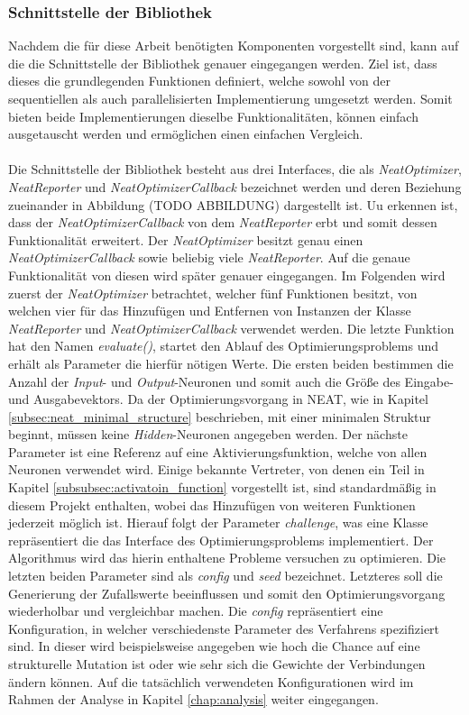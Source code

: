\subsubsection{Schnittstelle der Bibliothek}
Nachdem die für diese Arbeit benötigten Komponenten vorgestellt sind, kann auf die die Schnittstelle der Bibliothek genauer eingegangen werden. Ziel ist, dass dieses die grundlegenden Funktionen definiert, welche sowohl von der sequentiellen als auch parallelisierten Implementierung umgesetzt werden. Somit bieten beide Implementierungen dieselbe Funktionalitäten, können einfach ausgetauscht werden und ermöglichen einen einfachen Vergleich. 
\\\\
Die Schnittstelle der Bibliothek besteht aus drei Interfaces, die als \emph{NeatOptimizer}, \emph{NeatReporter} und \emph{NeatOptimizerCallback} bezeichnet werden und deren Beziehung zueinander in Abbildung (TODO ABBILDUNG) dargestellt ist. Uu erkennen ist, dass der \emph{NeatOptimizerCallback} von dem \emph{NeatReporter} erbt und somit dessen Funktionalität erweitert. Der \emph{NeatOptimizer} besitzt genau einen \emph{NeatOptimizerCallback} sowie beliebig viele \emph{NeatReporter}. Auf die genaue Funktionalität von diesen wird später genauer eingegangen. Im Folgenden wird zuerst der \emph{NeatOptimizer} betrachtet, welcher fünf Funktionen besitzt, von welchen vier für das Hinzufügen und Entfernen von Instanzen der Klasse \emph{NeatReporter} und \emph{NeatOptimizerCallback} verwendet werden. Die letzte Funktion hat den Namen \emph{evaluate()}, startet den Ablauf des Optimierungsproblems und erhält als Parameter die hierfür nötigen Werte. Die ersten beiden bestimmen die Anzahl der \emph{Input}- und \emph{Output}-Neuronen und somit auch die Größe des Eingabe- und Ausgabevektors. Da der Optimierungsvorgang in \ac{NEAT}, wie in Kapitel \ref{subsec:neat_minimal_structure}  beschrieben, mit einer minimalen Struktur beginnt, müssen keine \emph{Hidden}-Neuronen angegeben werden. Der nächste Parameter ist eine Referenz auf eine Aktivierungsfunktion, welche von allen Neuronen verwendet wird. Einige bekannte Vertreter, von denen ein Teil in Kapitel \ref{subsubsec:activatoin_function} vorgestellt ist, sind standardmäßig in diesem Projekt enthalten, wobei das Hinzufügen von weiteren Funktionen jederzeit möglich ist. Hierauf folgt der Parameter \emph{challenge}, was eine Klasse repräsentiert die das Interface des Optimierungsproblems implementiert. Der Algorithmus wird das hierin enthaltene Probleme versuchen zu optimieren. Die letzten beiden Parameter sind als \emph{config} und \emph{seed} bezeichnet. Letzteres soll die Generierung der Zufallswerte beeinflussen und somit den Optimierungsvorgang wiederholbar und vergleichbar machen. Die \emph{config} repräsentiert eine Konfiguration, in welcher verschiedenste Parameter des Verfahrens spezifiziert sind. In dieser wird beispielsweise angegeben wie hoch die Chance auf eine strukturelle Mutation ist oder wie sehr sich die Gewichte der Verbindungen ändern können. Auf die tatsächlich verwendeten Konfigurationen wird im Rahmen der Analyse in Kapitel \ref{chap:analysis} weiter eingegangen.
